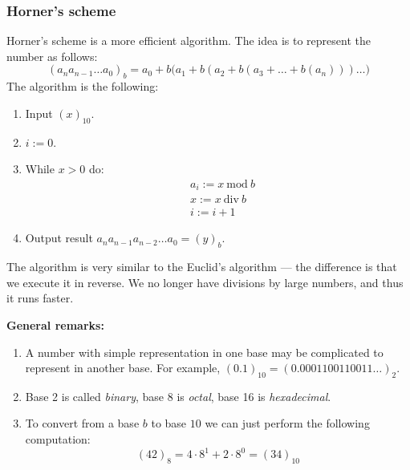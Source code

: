 \subsubsection{Horner's scheme}
Horner's scheme is a more efficient algorithm. The idea is to represent
the number as follows:
\[
    (a_n a_{n - 1} \dots a_{0})_b = 
    a_0 + b\bigl(a_1 + b(a_2 + b(a_3 + \dots + b (a_n))) \dots \bigr)
\]
The algorithm is the following:
\begin{enumerate}
    \item {
        Input $(x)_{10}$.
    }
    \item {
        $i := 0$.
    }
    \item {
        While $x > 0$ do:
        \begin{align*}
            &
            a_i := x \ \mathrm{mod}\ b
            \\&
            x := x \ \mathrm{div}\ b
            \\&
            i := i + 1
        \end{align*}
    }
    \item {
        Output result $a_n a_{n-1} a_{n-2} \dots a_0 = (y)_b$.
    }
\end{enumerate}
\begin{remark}
    The algorithm is very similar to the Euclid's algorithm ---
    the difference is that we execute it in reverse. 
    We no longer have divisions by large numbers, and thus
    it runs faster.
\end{remark}

\textbf{General remarks:}
\begin{enumerate}
    \item {
        A number with simple representation in one base 
        may be complicated to represent in another base.
        For example,
        $(0.1)_{10} = (0.0001100110011\dots)_2$.
    }
    \item {
        Base 2 is called \textit{binary},
        base 8 is \textit{octal},
        base 16 is \textit{hexadecimal}.
    }
    \item {
        To convert from a base $b$
        to base $10$ we can just perform the following computation:
        \[
            (42)_8 = 4 \cdot 8^1 + 2 \cdot 8^0 = (34)_{10}
        \]
    }
\end{enumerate}